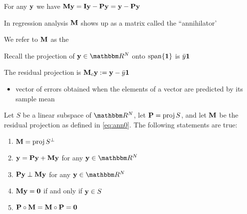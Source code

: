 \begin{frame}

     \vspace{2em}
    For any ${\mathbf y}$ we have 
    $\mathbf M {\mathbf y} = \mathbf I {\mathbf y} - \mathbf P {\mathbf y} = {\mathbf y} - \mathbf P {\mathbf y}$
    
    \vspace{.7em}
    In regression analysis $\mathbf M$ shows up as a matrix 
    called the ``annihilator'
    
    \vspace{.7em}
    We  refer to $\mathbf M$ as the 
    
\end{frame}

\begin{frame}

     \vspace{2em}
    \Eg
    Recall the projection of
    $\boldy \in \RR^N$ onto $\operatorname{span}\{{\mathbf 1}\}$ is
    $\bar y {\mathbf 1}$
    
    The residual projection is $\mathbf M_c {\mathbf y} := {\mathbf y} -
    \bar y {\mathbf 1}$
    \begin{itemize}
        \item  vector of errors obtained when the elements of a vector are
         predicted by its sample mean
    \end{itemize}
    
    
\end{frame}

\begin{frame}

    \vspace{2em}
    \Fact{\eqref{ET-fa:opt3}}
    Let $S$ be a linear subspace of $\RR^N$, let $\mathbf P = \operatorname{proj} S$, and let
    $\mathbf M$ be the residual projection as defined in \eqref{eq:ann0}.  The
    following statements are true:
    \begin{enumerate}
        \item $\mathbf M = \operatorname{proj} S^{\perp}$
        \item ${\mathbf y} = \mathbf P {\mathbf y} + \mathbf M {\mathbf y}$ for any $\boldy \in
            \RR^N$
        \item $\mathbf P {\mathbf y} \perp \mathbf M {\mathbf y}$ for any $\boldy \in \RR^N$
        \item $\mathbf M {\mathbf y} = {\mathbf 0}$ if and only if ${\mathbf y} \in S$
        \item $\mathbf P \circ \mathbf M = \mathbf M \circ \mathbf P = {\mathbf 0}$
    \end{enumerate}
\end{frame}

